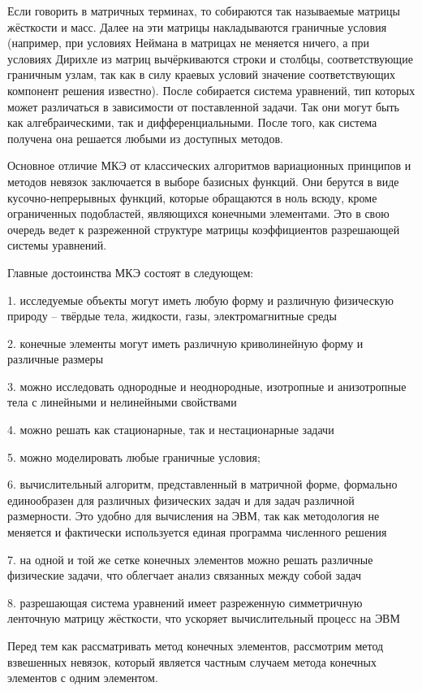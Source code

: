 \documentclass[14pt]{extreport}
\begin{document}
Если говорить в матричных терминах, то собираются так называемые матрицы жёсткости и масс. Далее на эти матрицы накладываются граничные условия (например, при условиях Неймана в матрицах не меняется ничего, а при условиях Дирихле из матриц вычёркиваются строки и столбцы, соответствующие граничным узлам, так как в силу краевых условий значение соответствующих компонент решения известно). После собирается система уравнений, тип которых может различаться в зависимости от поставленной задачи. Так они могут быть как алгебраическими, так и дифференциальными. После того, как система получена она решается любыми из доступных методов.

Основное отличие МКЭ от классических алгоритмов вариационных принципов и методов невязок заключается в выборе базисных функций. Они берутся в виде кусочно-непрерывных функций, которые обращаются в ноль всюду, кроме ограниченных подобластей, являющихся конечными элементами. Это в свою очередь ведет к разреженной структуре матрицы коэффициентов разрешающей системы уравнений.

Главные достоинства МКЭ состоят в следующем:

1. исследуемые объекты могут иметь любую форму и различную физическую природу – твёрдые тела, жидкости, газы, электромагнитные среды

2. конечные элементы могут иметь различную криволинейную форму и различные размеры

3. можно исследовать однородные и неоднородные, изотропные и анизотропные тела с линейными и нелинейными свойствами

4. можно решать как стационарные, так и нестационарные задачи

5. можно моделировать любые граничные условия;

6. вычислительный алгоритм, представленный в матричной форме, формально единообразен для различных физических задач и для задач различной размерности. Это удобно для вычисления на ЭВМ, так как методология не меняется и фактически используется единая программа численного решения

7. на одной и той же сетке конечных элементов можно решать различные физические задачи, что облегчает анализ связанных между собой задач

8. разрешающая система уравнений имеет разреженную симметричную ленточную матрицу жёсткости, что ускоряет вычислительный процесс на ЭВМ

Перед тем как рассматривать метод конечных элементов, рассмотрим метод взвешенных невязок, который является частным случаем метода конечных элементов с одним элементом.
\end{document}
